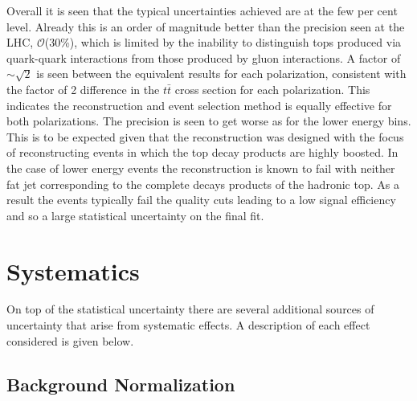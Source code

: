 Overall it is seen that the typical uncertainties achieved are at the few per cent level. Already this is an order of magnitude better than the precision seen at the \ac{LHC}, $\mathcal{O}$(30\%)\cite{Bai:2011uk}, which is limited by the inability to distinguish tops produced via quark-quark interactions from those produced by gluon interactions. A factor of $\sim\sqrt{2}$ is seen between the equivalent results for each polarization, consistent with the factor of 2 difference in the $t\bar{t}$ cross section for each polarization. This indicates the reconstruction and event selection method is equally effective for both polarizations. The precision is seen to get worse as for the lower energy bins. This is to be expected given that the reconstruction was designed with the focus of reconstructing events in which the top decay products are highly boosted. In the case of lower energy events the reconstruction is known to fail with neither fat jet corresponding to the complete decays products of the hadronic top. As a result the events typically fail the quality cuts leading to a low signal efficiency and so a large statistical uncertainty on the final fit.

\section{Systematics}
\label{sec:topsystematics}

On top of the statistical uncertainty there are several additional sources of uncertainty that arise from systematic effects. A description of each effect considered is given below. 

\subsection{Background Normalization}

